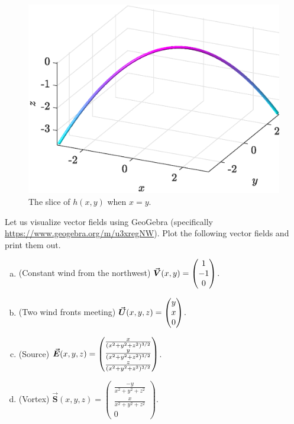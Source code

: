 \documentclass[12pt]{article} %
\begin{document}
\begin{solution}
\begin{enumerate}[(a)]
\begin{figure}[H]
        \centering
        \includegraphics[width=.8\textwidth]{figures/3c_x=y}
        \caption{The slice of $h(x,y)$ when $x=y$.}
    \end{figure}
\end{enumerate}
\end{solution}

\newpage
\begin{problem} 
Let us visualize vector fields using GeoGebra (specifically \url{https://www.geogebra.org/m/u3xregNW}). Plot the following vector fields and print them out. 
\begin{enumerate}[(a)]
    \item (Constant wind from the northwest) $\boldsymbol{\vec{V}}(x,y)=\begin{pmatrix} 1 \\ -1 \\ 0\end{pmatrix}$.
    \item (Two wind fronts meeting) $\boldsymbol{\vec{U}}(x,y,z)=\begin{pmatrix} y \\ x \\ 0 \end{pmatrix}$.
    \item (Source) $\boldsymbol{\vec{E}}(x,y,z) = \begin{pmatrix} \frac{x}{(x^2+y^2+z^2)^{3/2}} \\ \frac{y}{(x^2+y^2+z^2)^{3/2}} \\ \frac{z}{(x^2+y^2+z^2)^{3/2}} \end{pmatrix}$.
    \item (Vortex) $\boldsymbol{\vec{S}}(x,y,z)=\begin{pmatrix} \frac{-y}{x^2+y^2+z^2} \\ \frac{x}{x^2+y^2+z^2} \\ 0\end{pmatrix}.$           
\end{enumerate}
\end{problem}
\end{document}
